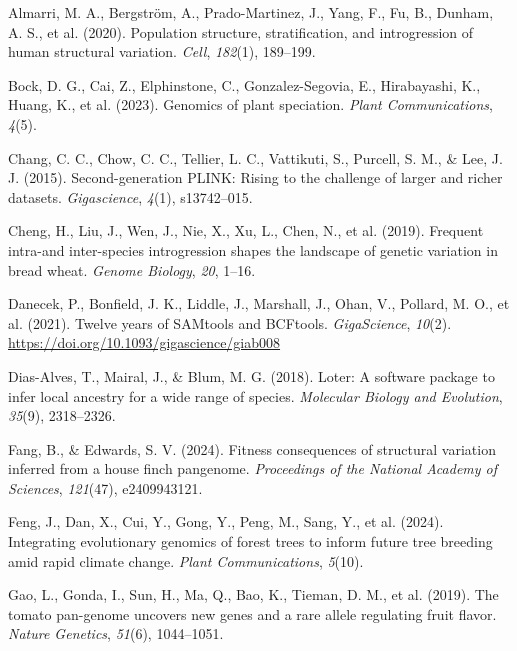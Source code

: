 \documentclass[
]{agujournal2019}
\newlength{\cslhangindent}
\newenvironment{CSLReferences}[2] %
 {\begin{list}{}{%
  \setlength{\itemindent}{0pt}
  \setlength{\leftmargin}{0pt}
  \setlength{\parsep}{0pt}
  \ifodd #1
   \setlength{\leftmargin}{\cslhangindent}
   \setlength{\itemindent}{-1\cslhangindent}
  \fi
  \setlength{\itemsep}{#2\baselineskip}}}
 {\end{list}}
\begin{document}
\label{refs}
\begin{CSLReferences}{1}{0}
\vspace{1em}

Almarri, M. A., Bergström, A., Prado-Martinez, J., Yang, F., Fu, B.,
Dunham, A. S., et al. (2020). Population structure, stratification, and
introgression of human structural variation. \emph{Cell}, \emph{182}(1),
189--199.

Bock, D. G., Cai, Z., Elphinstone, C., Gonzalez-Segovia, E.,
Hirabayashi, K., Huang, K., et al. (2023). Genomics of plant speciation.
\emph{Plant Communications}, \emph{4}(5).

Chang, C. C., Chow, C. C., Tellier, L. C., Vattikuti, S., Purcell, S.
M., \& Lee, J. J. (2015). Second-generation PLINK: Rising to the
challenge of larger and richer datasets. \emph{Gigascience},
\emph{4}(1), s13742--015.

Cheng, H., Liu, J., Wen, J., Nie, X., Xu, L., Chen, N., et al. (2019).
Frequent intra-and inter-species introgression shapes the landscape of
genetic variation in bread wheat. \emph{Genome Biology}, \emph{20},
1--16.

Danecek, P., Bonfield, J. K., Liddle, J., Marshall, J., Ohan, V.,
Pollard, M. O., et al. (2021). Twelve years of SAMtools and BCFtools.
\emph{GigaScience}, \emph{10}(2).
\url{https://doi.org/10.1093/gigascience/giab008}

Dias-Alves, T., Mairal, J., \& Blum, M. G. (2018). Loter: A software
package to infer local ancestry for a wide range of species.
\emph{Molecular Biology and Evolution}, \emph{35}(9), 2318--2326.

Fang, B., \& Edwards, S. V. (2024). Fitness consequences of structural
variation inferred from a house finch pangenome. \emph{Proceedings of
the National Academy of Sciences}, \emph{121}(47), e2409943121.

Feng, J., Dan, X., Cui, Y., Gong, Y., Peng, M., Sang, Y., et al. (2024).
Integrating evolutionary genomics of forest trees to inform future tree
breeding amid rapid climate change. \emph{Plant Communications},
\emph{5}(10).

Gao, L., Gonda, I., Sun, H., Ma, Q., Bao, K., Tieman, D. M., et al.
(2019). The tomato pan-genome uncovers new genes and a rare allele
regulating fruit flavor. \emph{Nature Genetics}, \emph{51}(6),
1044--1051.


\end{CSLReferences}
\end{document}
